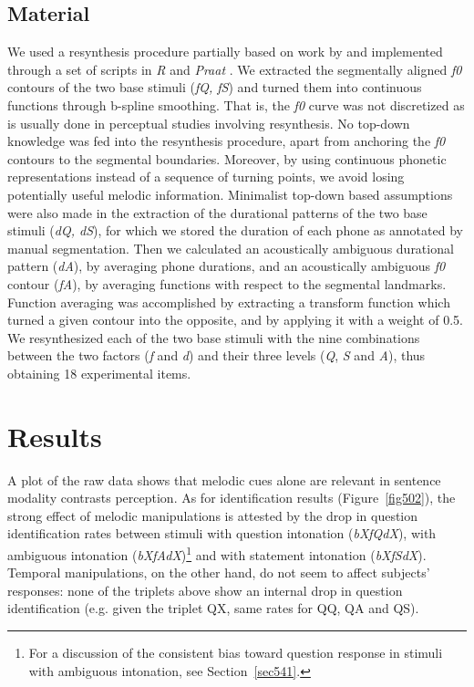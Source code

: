 \subsection{Material}\label{sec522}
We used a resynthesis procedure partially based on work by \citet{gubian2010automatic,gubian2011joint} and implemented through a set of scripts in \textit{R} \citep{r2008r} and \textit{Praat} \citep{boersma2008praat}. We extracted the segmentally aligned \textit{f0} contours of the two base stimuli (\textit{fQ, fS}) and turned them into continuous functions through b-spline smoothing. That is, the \textit{f0} curve was not discretized as is usually done in perceptual studies involving resynthesis. No top-down knowledge was fed into the resynthesis procedure, apart from anchoring the \textit{f0} contours to the segmental boundaries. Moreover, by using continuous phonetic representations instead of a sequence of turning points, we avoid losing potentially useful melodic information. Minimalist top-down based assumptions were also made in the extraction of the durational patterns of the two base stimuli (\textit{dQ, dS}), for which we stored the duration of each phone as annotated by manual segmentation.
Then we calculated an acoustically ambiguous durational pattern (\textit{dA}), by averaging phone durations, and an acoustically ambiguous \textit{f0} contour (\textit{fA}), by averaging functions with respect to the segmental landmarks. Function averaging was accomplished by extracting a transform function which turned a given contour into the opposite, and by applying it with a weight of 0.5. We resynthesized each of the two base stimuli with the nine combinations between the two factors (\textit{f} and \textit{d}) and their three levels (\textit{Q}, \textit{S} and \textit{A}), thus obtaining 18 experimental items.

\section{Results}\label{sec53}
A plot of the raw data shows that melodic cues alone are relevant in sentence modality contrasts perception.
As for identification results (Figure~\ref{fig502}), the strong effect of melodic manipulations is attested by the drop in question identification rates between stimuli with question intonation (\textit{bXfQdX}), with ambiguous intonation (\textit{bXfAdX})\footnote{For a discussion of the consistent bias toward question response in stimuli with ambiguous intonation, see Section~\ref{sec541}.} and with statement intonation (\textit{bXfSdX}). Temporal manipulations, on the other hand, do not seem to affect subjects' responses: none of the triplets above show an internal drop in question identification (e.g. given the triplet QX, same rates for QQ, QA and QS).

